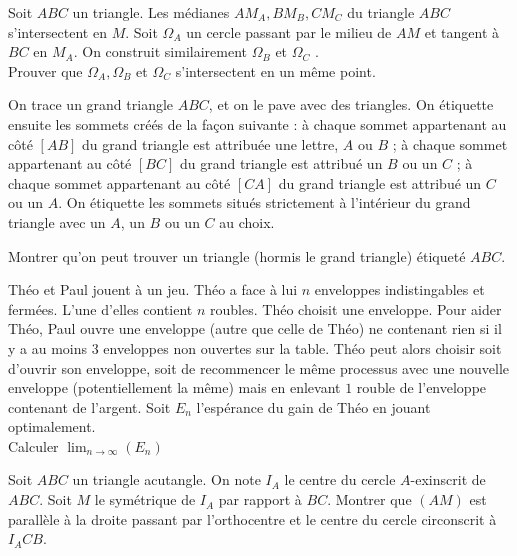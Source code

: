 \begin{exo}{}
Soit $ABC$ un triangle. Les médianes $AM_A,BM_B,CM_C$ du triangle $ABC$ s'intersectent en $M$. Soit $\Omega_A$ un cercle passant par le milieu de $AM$ et tangent à $BC$ en $M_A$. On construit similairement $\Omega_B$ et $\Omega_C$ . \\Prouver que $\Omega_A,\Omega_B$ et $\Omega_C$ s'intersectent en un même point.

\end{exo}


\begin{exo}{}
On trace un grand triangle $ABC$, et on le pave avec des triangles. On
étiquette ensuite les sommets créés de la façon suivante : à chaque
sommet appartenant au côté $[AB]$ du grand triangle est attribuée
une lettre, $A$ ou $B$ ; à chaque sommet appartenant au côté $[BC]$
du grand triangle est attribué un $B$ ou un $C$ ; à chaque sommet
appartenant au côté $[CA]$ du grand triangle est attribué un $C$ ou un $A$.
On étiquette les sommets situés strictement à l'intérieur du grand triangle
avec un $A$, un $B$ ou un $C$ au choix.

Montrer qu'on peut trouver un triangle (hormis le grand triangle) étiqueté $ABC$.
 \end{exo}


\begin{exo}{}
Théo et Paul jouent à un jeu. Théo a face à lui $n$ enveloppes indistingables et fermées. L'une d'elles contient $n$ roubles. Théo choisit une enveloppe. Pour aider Théo, Paul ouvre une enveloppe (autre que celle de Théo) ne contenant rien si il y a au moins $3$ enveloppes non ouvertes sur la table. Théo peut alors choisir soit d'ouvrir son enveloppe, soit de recommencer le même processus avec une nouvelle enveloppe (potentiellement la même) mais en enlevant $1$ rouble de l'enveloppe contenant de l'argent. Soit $E_n$ l'espérance du gain de Théo en jouant optimalement. \\
Calculer $\lim_{n\to \infty}(E_n)$
\end{exo}

\begin{exo}{}
Soit $ABC$ un triangle acutangle. On note $I_A$ le centre du cercle $A$-exinscrit de $ABC$. Soit $M$ le symétrique de $I_A$ par rapport à $BC$. Montrer que $(AM)$ est parallèle à la droite passant par l'orthocentre et le centre du cercle circonscrit à $I_ACB$.

\end{exo}



